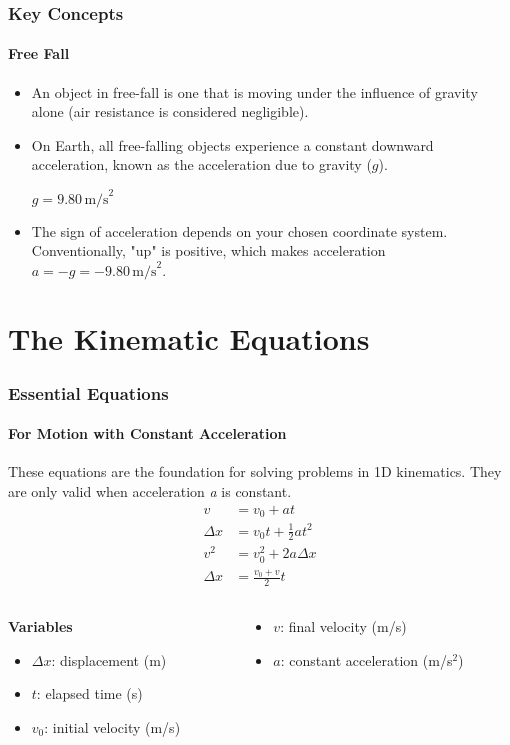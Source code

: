 \documentclass{beamer}
\begin{document}
\begin{frame}
\frametitle{Key Concepts}
\framesubtitle{Free Fall}
\begin{itemize}
    \item An object in \alert{free-fall} is one that is moving under the influence of gravity alone (air resistance is considered negligible).
    \pause
    \item On Earth, all free-falling objects experience a constant downward acceleration, known as the \alert{acceleration due to gravity ($g$)}.
    \begin{center}
        $g = 9.80 \, \text{m/s}^2$
    \end{center}
    \pause
    \item The sign of acceleration depends on your chosen coordinate system. Conventionally, "up" is positive, which makes acceleration $a = -g = -9.80 \, \text{m/s}^2$.
\end{itemize}
\end{frame}

\section{The Kinematic Equations}

\begin{frame}
\frametitle{Essential Equations}
\framesubtitle{For Motion with Constant Acceleration}
These equations are the foundation for solving problems in 1D kinematics. They are only valid when acceleration \textit{a} is constant.
\begin{align*}
    v &= v_0 + at \\
    \Delta x &= v_0 t + \frac{1}{2}at^2 \\
    v^2 &= v_0^2 + 2a\Delta x \\
    \Delta x &= \frac{v_0 + v}{2} t
\end{align*}
\vspace{1em}
\begin{columns}[T]
    \begin{column}{0.5\textwidth}
        \textbf{Variables}
        \begin{itemize}
            \item $\Delta x$: displacement (m)
            \item $t$: elapsed time (s)
            \item $v_0$: initial velocity (m/s)
        \end{itemize}
    \end{column}
    \begin{column}{0.5\textwidth}
        \begin{itemize}
            \item $v$: final velocity (m/s)
            \item $a$: constant acceleration (m/s$^2$)
        \end{itemize}
    \end{column}
\end{columns}
\end{frame}
\end{document}
